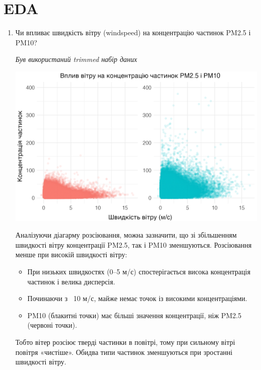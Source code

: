 \documentclass{article}
\begin{document}
\begin{enumerate}
    
\end{enumerate}

\pagebreak

\section{EDA}

\begin{enumerate}
    \item Чи впливає швидкість вітру (windspeed) на концентрацію частинок PM2.5 і PM10?
    
    \quad \textit{Був використаний trimmed набір даних}

    \includegraphics[width=6in]{plots/question1/wind_speed_vs_pm.png}

    Аналізуючи діагарму розсіювання, можна зазначити, що зі збільшенням швидкості вітру концентрації PM2.5, так і PM10 зменшуються.
    Розсіювання менше при високій швидкості вітру:
    \begin{itemize}
        \item При низьких швидкостях (0–5 м/с) спостерігається висока концентрація частинок і велика дисперсія.
        \item Починаючи з ~10 м/с, майже немає точок із високими концентраціями.
        \item PM10 (блакитні точки) має більші значення концентрації, ніж PM2.5 (червоні точки).
    \end{itemize}
    Тобто вітер розсіює тверді частинки в повітрі, тому при сильному вітрі повітря «чистіше». Обидва типи частинок зменшуються при зростанні швидкості вітру.


\end{enumerate}
\end{document}
